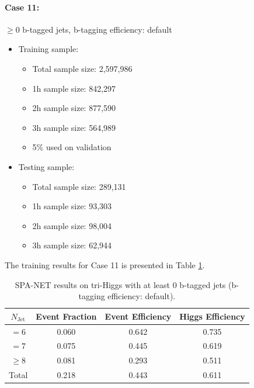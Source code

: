 \documentclass[12pt]{article}
\begin{document}
		\paragraph{Case 11:} $\ge 0$ b-tagged jets, b-tagging efficiency: default
		\begin{itemize}
			\item Training sample:
			\begin{itemize}
				\item Total sample size: 2,597,986
				\item 1h sample size: 842,297
				\item 2h sample size: 877,590
				\item 3h sample size: 564,989
				\item 5\% used on validation
			\end{itemize}
			\item Testing sample: 
				\begin{itemize}
					\item Total sample size: 289,131
					\item 1h sample size: 93,303
					\item 2h sample size: 98,004
					\item 3h sample size: 62,944
				\end{itemize}
		\end{itemize}
		The training results for Case 11 is presented in Table \ref{tab:SPANet_triHiggs_0btag_default_5M}.
		\begin{table}[htpb]
			\centering
			\caption{SPA-NET results on tri-Higgs with at least 0 b-tagged jets (b-tagging efficiency: default).}
			\label{tab:SPANet_triHiggs_0btag_default_5M}
			\begin{tabular}{c|c|cc}
				$N_\text{Jet}$ & Event Fraction & Event Efficiency & Higgs Efficiency \\
				\hline
				$=6$	  &   0.060             &    0.642              &    0.735             \\
				$=7$	  &   0.075             &    0.445              &    0.619             \\
				$\ge 8$	  &   0.081             &    0.293              &    0.511             \\
				Total	  &   0.218             &    0.443              &    0.611             \\
			\end{tabular}
		\end{table}
\end{document}
